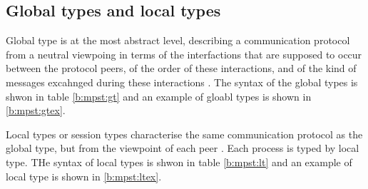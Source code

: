 \subsection{Global types and local types} \label{b:mpst:st}
Global type is at the most abstract level, describing a communication protocol from a neutral viewpoing in terms of the interfactions that are supposed to occur between the protocol peers, of the order of these interactions, and of the kind of messages excahnged during these interactions \cite{coppoGentleIntroductionMultiparty2015}. The syntax of the global types is shwon in table \ref{b:mpst:gt} and an example of gloabl types is shown in \ref{b:mpst:gtex}.

Local types or session types characterise the same communication protocol as the global type, but from the viewpoint of each peer \cite{coppoGentleIntroductionMultiparty2015}. Each process is typed by local type. THe syntax of local types is shwon in table \ref{b:mpst:lt} and an example of local type is shown in \ref{b:mpst:ltex}. 

